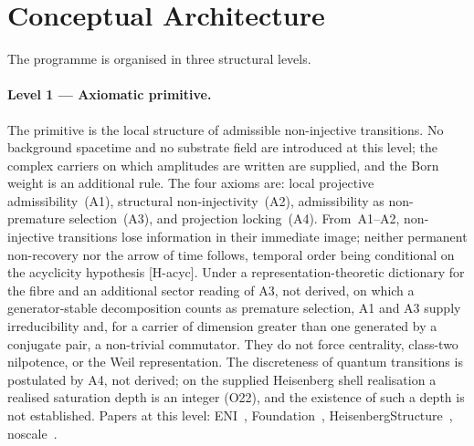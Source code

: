 \documentclass[11pt,a4paper]{article}
\begin{document}
  \section{Conceptual Architecture}
  \label{sec:architecture}

  The programme is organised in three structural levels.

  \paragraph{Level 1 --- Axiomatic primitive.}
    The primitive is the local structure of admissible non-injective transitions.
    No background spacetime and no substrate field are introduced at this level; the complex carriers on which
    amplitudes are written are supplied, and the Born weight is an additional rule.
    The four axioms are: local projective admissibility~(A1), structural non-injectivity~(A2),
    admissibility as non-premature selection~(A3), and projection locking~(A4).
    From~A1--A2, non-injective transitions lose information in their immediate image; neither permanent
    non-recovery nor the arrow of time follows, temporal order being conditional on the acyclicity
    hypothesis [H-acyc].
    Under a representation-theoretic dictionary for the fibre and an additional sector reading of A3, not
    derived, on which a generator-stable decomposition counts as premature selection, A1 and A3 supply
    irreducibility and, for a carrier of dimension greater than one generated by a conjugate pair, a non-trivial
    commutator.
    They do not force centrality, class-two nilpotence, or the Weil representation.
    The discreteness of quantum transitions is postulated by A4, not derived; on the supplied Heisenberg shell
    realisation a realised saturation depth is an integer (O22), and the existence of such a depth is not
    established.
    Papers at this level: ENI~\cite{Beau2026l}, Foundation~\cite{Beau2026m},
    HeisenbergStructure~\cite{Beau2026HeisenbergStructure}, noscale~\cite{Beau2026j}.
\end{document}

